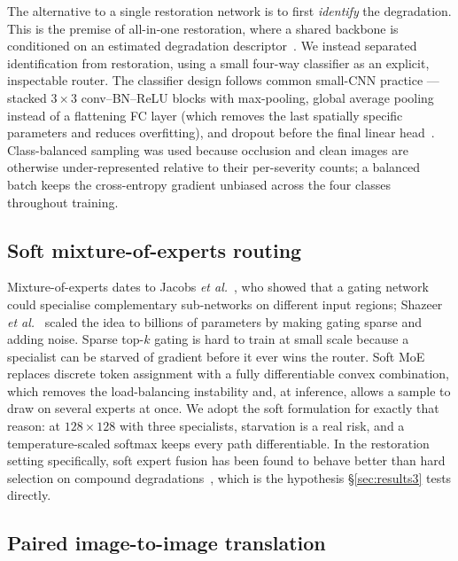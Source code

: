 \documentclass[journal]{IEEEtran}
\begin{document}
The alternative to a single restoration network is to first \emph{identify} the degradation. This is the premise of all-in-one restoration, where a shared backbone is conditioned on an estimated degradation descriptor~\cite{zamfir2025complexity}. We instead separated identification from restoration, using a small four-way classifier as an explicit, inspectable router. The classifier design follows common small-CNN practice --- stacked $3\times3$ conv--BN--ReLU blocks with max-pooling, global average pooling instead of a flattening FC layer (which removes the last spatially specific parameters and reduces overfitting), and dropout before the final linear head~\cite{srivastava2014dropout}. Class-balanced sampling was used because occlusion and clean images are otherwise under-represented relative to their per-severity counts; a balanced batch keeps the cross-entropy gradient unbiased across the four classes throughout training.

\subsection{Soft mixture-of-experts routing}

Mixture-of-experts dates to Jacobs \emph{et al.}~\cite{jacobs1991adaptive}, who showed that a gating network could specialise complementary sub-networks on different input regions; Shazeer \emph{et al.}~\cite{shazeer2017sparsely} scaled the idea to billions of parameters by making gating sparse and adding noise. Sparse top-$k$ gating is hard to train at small scale because a specialist can be starved of gradient before it ever wins the router. Soft MoE~\cite{puigcerver2024softmoe} replaces discrete token assignment with a fully differentiable convex combination, which removes the load-balancing instability and, at inference, allows a sample to draw on several experts at once. We adopt the soft formulation for exactly that reason: at $128\times128$ with three specialists, starvation is a real risk, and a temperature-scaled softmax keeps every path differentiable. In the restoration setting specifically, soft expert fusion has been found to behave better than hard selection on compound degradations~\cite{zamfir2025complexity,puigcerver2024softmoe}, which is the hypothesis \S\ref{sec:results3} tests directly.

\subsection{Paired image-to-image translation}
\end{document}
